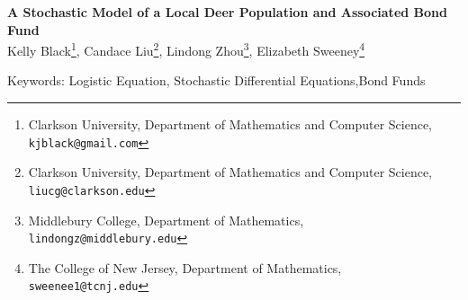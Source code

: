 \documentclass[12pt]{article}
\begin{document}
\begin{center}
  \textbf{A Stochastic Model of a Local Deer Population and Associated Bond Fund} \\
  Kelly Black\footnote{Clarkson University, Department of Mathematics
    and Computer Science, \texttt{kjblack@gmail.com}},
    Candace Liu\footnote{Clarkson University, Department of Mathematics
      and Computer Science, \texttt{liucg@clarkson.edu}},
    Lindong Zhou\footnote{Middlebury College, Department of Mathematics, 
      \texttt{lindongz@middlebury.edu}}, 
    Elizabeth Sweeney\footnote{The College of New Jersey, Department of Mathematics, 
      \texttt{sweenee1@tcnj.edu}}
\end{center}


\begin{abstract}
\end{abstract}


Keywords: Logistic Equation, Stochastic Differential Equations,Bond Funds
















\end{document}
